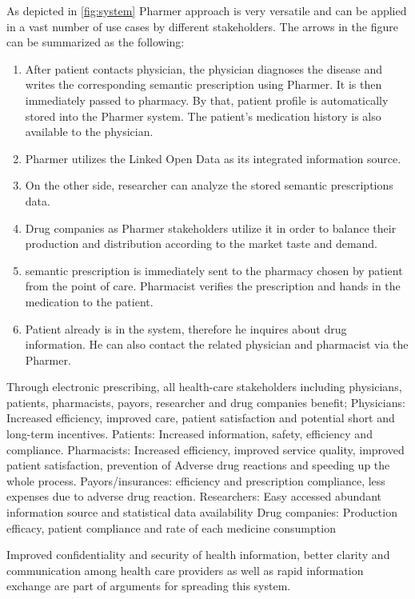 \documentclass[10pt, conference, compsocconf]{IEEEtran}
\begin{document}
As depicted in \autoref{fig:system} Pharmer approach is very versatile and can be applied in a vast number of use cases by different stakeholders. The arrows in the figure can be summarized as the following:
\begin{enumerate}
\item After patient contacts physician, the physician diagnoses the disease and writes the corresponding semantic prescription using Pharmer. It is then immediately passed to pharmacy. By that, patient profile is automatically stored into the Pharmer system. The patient's medication history is also available to the physician.
\item Pharmer utilizes the Linked Open Data as its integrated information source.
\item On the other side, researcher can analyze the stored semantic prescriptions data.
\item Drug companies as Pharmer stakeholders utilize it in order to balance their production and distribution according to the market taste and demand.
\item semantic prescription is immediately sent to the pharmacy chosen by patient from the point of care. Pharmacist verifies the prescription and hands in the medication to the patient.
\item Patient already is in the system, therefore he inquires about drug information. He can also contact the related physician and pharmacist via the Pharmer.
\end{enumerate}

Through electronic prescribing, all health-care stakeholders including physicians, patients, pharmacists, payors, researcher and drug companies benefit;
Physicians: Increased efficiency, improved care, patient satisfaction and potential short and long-term incentives.
Patients: Increased information, safety, efficiency and compliance.
Pharmacists: Increased efficiency, improved service quality, improved patient satisfaction,  prevention of Adverse drug reactions and speeding up the whole process.
Payors/insurances: efficiency and prescription compliance, less expenses due to adverse drug reaction.
Researchers: Easy accessed abundant information source and statistical data availability
Drug companies: Production efficacy, patient compliance and rate of each medicine consumption

Improved confidentiality and security of health information, better clarity and communication among health care providers as well as rapid information exchange are part of arguments for spreading this system.
\end{document}
